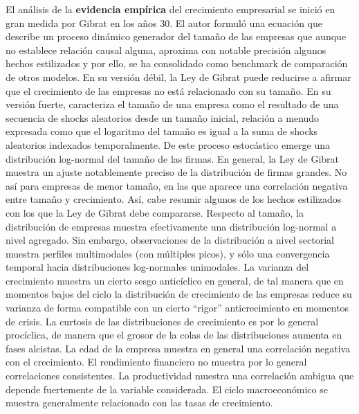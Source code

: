 \documentclass{nuevotema}
\begin{document}
El análisis de la \textbf{evidencia empírica} del crecimiento empresarial se inició en gran medida por Gibrat en los años 30. El autor formuló una ecuación que describe un proceso dinámico generador del tamaño de las empresas que aunque no establece relación causal alguna, aproxima con notable precisión algunos hechos estilizados y por ello, se ha consolidado como benchmark de comparación de otros modelos. En su versión débil, la Ley de Gibrat puede reducirse a afirmar que el crecimiento de las empresas no está relacionado con su tamaño. En su versión fuerte, caracteriza el tamaño de una empresa como el resultado de una secuencia de shocks aleatorios desde un tamaño inicial, relación a menudo expresada como que el logaritmo del tamaño es igual a la suma de shocks aleatorios indexados temporalmente. De este proceso estocástico emerge una distribución log-normal del tamaño de las firmas. En general, la Ley de Gibrat muestra un ajuste notablemente preciso de la distribución de firmas grandes. No así para empresas de menor tamaño, en las que aparece una correlación negativa entre tamaño y crecimiento. Así, cabe resumir algunos de los hechos estilizados con los que la Ley de Gibrat debe compararse. Respecto al tamaño, la distribución de empresas muestra efectivamente una distribución log-normal a nivel agregado. Sin embargo, observaciones de la distribución a nivel sectorial muestra perfiles multimodales (con múltiples picos), y sólo una convergencia temporal hacia distribuciones log-normales unimodales. La varianza del crecimiento muestra un cierto sesgo anticíclico en general, de tal manera que en momentos bajos del ciclo la distribución de crecimiento de las empresas reduce su varianza de forma compatible con un cierto ``rigor'' anticrecimiento en momentos de crisis. La curtosis de las distribuciones de crecimiento es por lo general procíclica, de manera que el grosor de la colas de las distribuciones aumenta en fases alcistas. La edad de la empresa muestra en general una correlación negativa con el crecimiento. El rendimiento financiero no muestra por lo general correlaciones consistentes. La productividad muestra una correlación ambigua que depende fuertemente de la variable considerada. El ciclo macroeconómico se muestra generalmente relacionado con las tasas de crecimiento.
\end{document}
